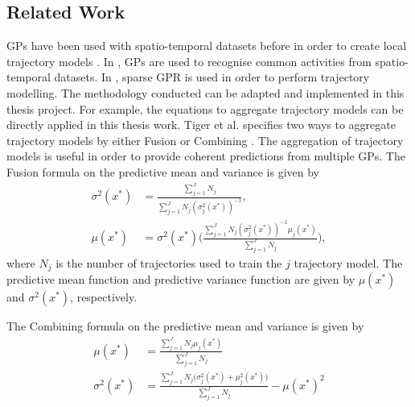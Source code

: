 \subsection{Related Work} \label{sec:trajectory-aggregation}
GPs have been used with spatio-temporal datasets before in order to create local trajectory models \cite{Tiger2015-unsupervised-learning,Tiger2015-online-sparse, Tiger2018-gp-motion-pattern}.
In \cite{Tiger2015-unsupervised-learning}, GPs are used to recognise common activities from spatio-temporal datasets.
In \cite{Tiger2015-online-sparse}, sparse GPR is used in order to perform trajectory modelling.
The methodology conducted can be adapted and implemented in this thesis project.
For example, the equations to aggregate trajectory models can be directly applied in this thesis work.
Tiger et al. specifies two ways to aggregate trajectory models by either Fusion or Combining \cite{Tiger2015-online-sparse}.
The aggregation of trajectory models is useful in order to provide coherent predictions from multiple GPs.
The Fusion formula on the predictive mean and variance is given by
\begin{align}
    \sigma^2(x^*) &= \frac{\sum_{j=1}^J N_j }{\sum_{j=1}^J N_j (\sigma^2_j(x^*))^{-1}}, \\
    \mu(x^*) &= \sigma^2(x^*) \Bigg( \frac{\sum_{j=1}^J N_j (\sigma^2_j(x^*))^{-1} \mu_j(x^*)}{\sum_{j=1}^J N_j} \Bigg),
\end{align}
where $N_j$ is the number of trajectories used to train the $j$ trajectory model.
The predictive mean function and predictive variance function are given by $\mu(x^*)$ and $\sigma^2(x^*)$, respectively.

The Combining formula on the predictive mean and variance is given by
\begin{align}
    \mu(x^*) &= \frac{\sum_{j=1}^J N_j \mu_j(x^*) }{\sum_{j=1}^J N_j} \label{eq:combining-mean} \\
    \sigma^2(x^*) &= \frac{\sum_{j=1}^J N_j \big(\sigma^2_j(x^*) + \mu^2_j(x^*)\big)}{\sum_{j=1}^J N_j} - \mu(x^*)^2 \label{eq:combining-var} 
\end{align}



